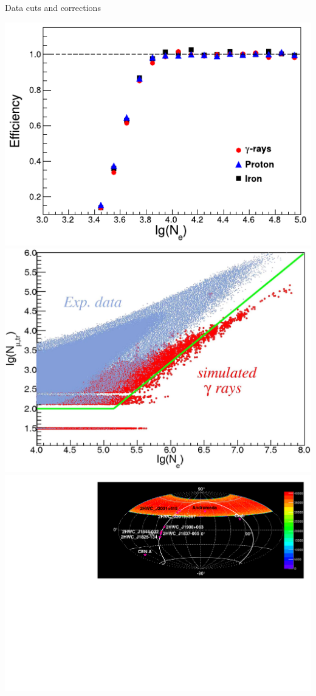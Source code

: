 \begin{frame}{Data cuts and corrections}
\begin{center}
  \includegraphics[height=0.39\textheight]{pics/eff_Ne_Donghwa.pdf}\hspace{1em}
  \includegraphics[height=0.39\textheight]{pics/gamma_cut.png}\\
  \includegraphics[height=0.42\textheight]{pics/Skymap_6srcs_exp.pdf}
\end{center}
\end{frame}

